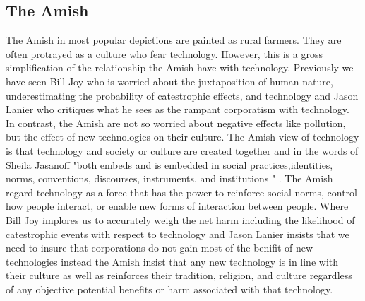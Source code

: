 \subsection{The Amish}
  The Amish in most popular depictions are painted as rural farmers. They are often protrayed as a culture who fear technology. However, this is a gross simplification of the relationship the Amish have with technology. Previously we have seen Bill Joy who is worried about the juxtaposition of human nature, underestimating the probability of catestrophic effects, and technology and Jason Lanier who critiques what he sees as the rampant corporatism with technology. In contrast, the Amish are not so worried about negative effects like pollution, but the effect of new technologies on their culture. The Amish view of technology is that technology and society or culture are created together and in the words of Sheila Jasanoff "both embeds and is embedded in social practices,identities, norms, conventions, discourses, instruments, and institutions " \cite{wetmore2007amish}. The Amish regard technology as a force that has the power to reinforce social norms, control how people interact, or enable new forms of interaction between people. Where Bill Joy implores us to accurately weigh the net harm including the likelihood of catestrophic events with respect to technology and Jason Lanier insists that we need to insure that corporations do not gain most of the benifit of new technologies instead the Amish insist that any new technology is in line with their culture as well as reinforces their tradition, religion, and culture regardless of any objective potential benefits or harm associated with that technology. 
\label{sec:-amish}

